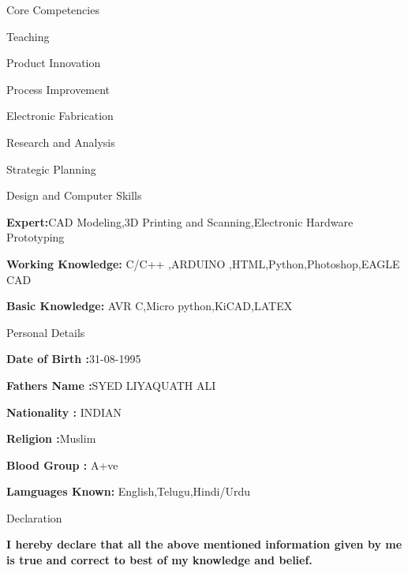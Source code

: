 \begin{cventries}
  \cventry
    {}
    {Core Competencies}
{}
{}
    {
       \begin{cvitems}
        \item { Teaching}
        \item {Product Innovation}
        \item {Process Improvement }
        \item {Electronic Fabrication}
        \item {Research and Analysis}
        \item {Strategic Planning}
      \end{cvitems}
    }
\cventry
    {}
    {Design and Computer Skills}
{}
{}
    {
       \begin{cvitems}
        \item { \textbf{Expert:}CAD Modeling,3D Printing and Scanning,Electronic Hardware Prototyping}
        \item {\textbf{Working Knowledge:} C/C++ ,ARDUINO ,HTML,Python,Photoshop,EAGLE CAD }
         \item {\textbf{Basic Knowledge:} AVR C,Micro python,KiCAD,LATEX}
      \end{cvitems}
    }
\cventry
    {}
    {Personal Details}
{}
{}
    {
       \begin{cvitems}
        \item { \textbf{Date of Birth       :}31-08-1995}
        \item {\textbf{Fathers Name      :}SYED LIYAQUATH ALI }
        \item {\textbf{Nationality            :} INDIAN}
        \item {\textbf{Religion                 :}Muslim}
        \item {\textbf{Blood Group          :} A+ve}
        \item {\textbf{Lamguages Known:} English,Telugu,Hindi/Urdu}
      \end{cvitems}
    }
\cventry
    {}
{ \centering Declaration}
{}
{}
    {
       \begin{cvitems}
        \item { \textbf{I hereby declare that all the above mentioned information given by me is true and correct to best of my knowledge and belief.}}
      \end{cvitems}
    }
\end{cventries}

